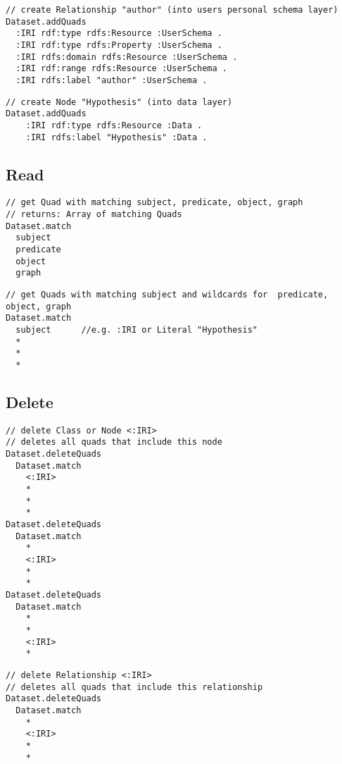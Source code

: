 \begin{lstlisting}
// create Relationship "author" (into users personal schema layer)
Dataset.addQuads
  :IRI rdf:type rdfs:Resource :UserSchema .
  :IRI rdf:type rdfs:Property :UserSchema .
  :IRI rdfs:domain rdfs:Resource :UserSchema .
  :IRI rdf:range rdfs:Resource :UserSchema .
  :IRI rdfs:label "author" :UserSchema .
\end{lstlisting}

\begin{lstlisting}
// create Node "Hypothesis" (into data layer)
Dataset.addQuads
    :IRI rdf:type rdfs:Resource :Data .
    :IRI rdfs:label "Hypothesis" :Data .

\end{lstlisting}

\subsection*{Read}  

\begin{lstlisting}
// get Quad with matching subject, predicate, object, graph 
// returns: Array of matching Quads
Dataset.match
  subject 
  predicate
  object
  graph
\end{lstlisting}


\begin{lstlisting}
// get Quads with matching subject and wildcards for  predicate, object, graph
Dataset.match
  subject      //e.g. :IRI or Literal "Hypothesis"
  * 
  *
  *

\end{lstlisting}


\subsection*{Delete}  

\begin{lstlisting}
// delete Class or Node <:IRI>
// deletes all quads that include this node
Dataset.deleteQuads
  Dataset.match
    <:IRI> 
    * 
    * 
    *
Dataset.deleteQuads
  Dataset.match
    * 
    <:IRI> 
    * 
    *
Dataset.deleteQuads
  Dataset.match
    * 
    * 
    <:IRI> 
    *

\end{lstlisting}
\begin{lstlisting}
// delete Relationship <:IRI>
// deletes all quads that include this relationship
Dataset.deleteQuads
  Dataset.match
    * 
    <:IRI> 
    * 
    *

\end{lstlisting}

